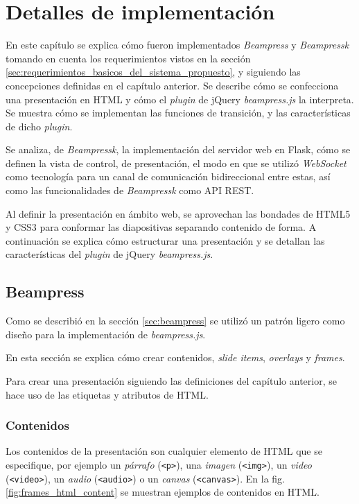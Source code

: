 \chapter{Detalles de implementación} %
\label{cha:detalles_de_implementacion}
	En este capítulo se explica cómo fueron implementados \textit{Beampress} y \textit{Beampressk} tomando en cuenta los requerimientos vistos en la sección \ref{sec:requerimientos_basicos_del_sistema_propuesto}, y siguiendo las concepciones definidas en el capítulo anterior. Se describe cómo se confecciona una presentación en HTML y cómo el \textit{plugin} de jQuery \textit{beampress.js} la interpreta. Se muestra cómo se implementan las funciones de transición, y las características de dicho \textit{plugin}.

	Se analiza, de \textit{Beampressk}, la implementación del servidor web en Flask, cómo se definen la vista de control, de presentación, el modo en que se utilizó \textit{WebSocket} como tecnología para un canal de comunicación bidireccional entre estas, así como las funcionalidades de \textit{Beampressk} como API REST.

	Al definir la presentación en ámbito web, se aprovechan las bondades de HTML5 y CSS3 para conformar las diapositivas separando contenido de forma. A continuación se explica cómo estructurar una presentación y se detallan las características del \textit{plugin} de jQuery \textit{beampress.js}. 

	\section{Beampress} %
	\label{sec:beampress_imp}
	

		Como se describió en la sección \ref{sec:beampress} se utilizó un patrón ligero como diseño para la implementación de \textit{beampress.js}. 

		En esta sección se explica cómo crear contenidos, \textit{slide items}, \textit{overlays} y \textit{frames}.

		Para crear una presentación siguiendo las definiciones del capítulo anterior, se hace uso de las etiquetas y atributos de HTML.


		\subsection{Contenidos} %
		\label{sub:contenidos}
			Los contenidos de la presentación son cualquier elemento de HTML que se especifique, por ejemplo un \textit{párrafo} (\texttt{<p>}), una \textit{imagen} (\texttt{<img>}), un \textit{video} (\texttt{<video>}), un \textit{audio} (\texttt{<audio>}) o un \textit{canvas} (\texttt{<canvas>}). En la fig. \ref{fig:frames_html_content} se muestran ejemplos de contenidos en HTML.

